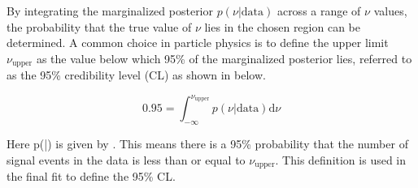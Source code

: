 By integrating the marginalized posterior $p(\nu|\text{data})$ across a range
of $\nu$ values, the probability that the true value of $\nu$ lies in the chosen
region can be determined.  A common choice in particle physics is to define the
upper limit $\nu_{\text{upper}}$ as the value below which 95\% of the marginalized
posterior lies, referred to as the 95\% credibility level (CL) as shown in
 below.

\begin{equation} \label{eq:fit:limit}
0.95 = \int_{-\infty}^{\nu_{\text{upper}}} p(\nu|\text{data}) \text{d}\nu
\end{equation}

Here p(\nu|) is given by . This means there is a
95\% probability that the number of signal events in the data is less than or equal to
$\nu_{\text{upper}}$.  This definition is used in the final fit to
define the 95\% CL.


